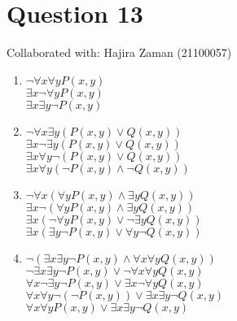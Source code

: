 \documentclass{article}
\begin{document}
\section{Question 13}
Collaborated with: Hajira Zaman (21100057) 
\begin{enumerate}
\item %
$\lnot \forall x \forall y  P(x,y)$ \\
$  \exists x \lnot \forall y  P(x,y)$ \\
$ \exists x \exists y \lnot P(x,y)$
\item %
$\lnot \forall x \exists y ( P(x,y) \vee Q(x,y))$ \\
$  \exists x \lnot \exists y ( P(x,y) \vee Q(x,y))$ \\
$ \exists x \forall y \lnot ( P(x,y) \vee Q(x,y))$ \\
$ \exists x \forall y (\lnot P(x,y) \wedge \lnot Q(x,y))$ 
\item %
$\lnot \forall x ( \forall y P(x,y) \wedge  \exists y Q(x,y))$ \\
$\exists x \lnot ( \forall y P(x,y) \wedge  \exists y Q(x,y))$ \\
$\exists x (\lnot \forall y P(x,y) \vee \lnot \exists y Q(x,y))$ \\
$\exists x (\exists y \lnot P(x,y) \vee \forall y \lnot Q(x,y))$
\item %
$\lnot (\exists x  \exists y  \lnot P(x,y) \wedge \forall x  \forall y Q(x,y))$ \\
$\lnot \exists x  \exists y  \lnot P(x,y) \vee \lnot \forall x  \forall y Q(x,y)$ \\
$\forall x \lnot \exists y  \lnot P(x,y) \vee \exists x \lnot \forall y Q(x,y)$ \\
$\forall x \forall y \lnot (\lnot P(x,y)) \vee \exists x \exists y \lnot Q(x,y)$ \\
$\forall x \forall y P(x,y) \vee \exists x \exists y \lnot Q(x,y)$

\end{enumerate}
\end{document}
